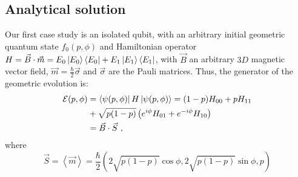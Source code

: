 \documentclass[draft,nofootinbib,pre,twocolumn,showpacs,showkeys,preprintnumbers,floatfix]{revtex4-1}
\newcommand{\1}{\mathbbm{1}}
\newcommand{\MV}[1]{\left\langle #1 \right\rangle}
\begin{document}
\subsection*{Analytical solution}

Our first case study is an isolated qubit, with an arbitrary initial geometric quantum 
state $f_0(p,\phi)$ and Hamiltonian operator $H = \vec{B} \cdot \vec{m} = E_0 \ket{E_0}\bra{E_0} + E_1 \ket{E_1}\bra{E_1}$,
with $\vec{B}$ an arbitrary $3D$ magnetic vector field, $\vec{m} = \frac{\hbar}{2}\vec{\sigma}$
and $\vec{\sigma}$ are the Pauli matrices. Thus, the generator of the geometric evolution is:
\begin{align}
\mathcal{E}(p,\phi) & = \bra{\psi(p,\phi)}H\ket{\psi(p,\phi)} = (1-p)H_{00} + p H_{11} \nonumber \\
&+ \sqrt{p(1-p)} \left(e^{i\phi}H_{01}+e^{-i\phi}H_{10} \right) \\
& = \vec{B} \cdot \vec{S} \nonumber~,
\end{align}
where 
\begin{equation}
\vec{S}= \MV{\vec{m}} = \frac{\hbar}{2}\left( 2\sqrt{p(1-p)}\cos \phi, 2\sqrt{p(1-p)}\sin \phi , p\right)\nonumber
\end{equation}
\end{document}
